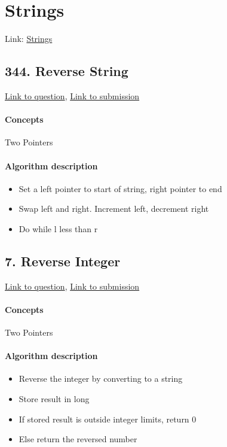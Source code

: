 \documentclass[11pt]{book}
\begin{document}
\newpage

\section{Strings}
Link: \href{https://leetcode.com/explore/interview/card/top-interview-questions-easy/127/strings/}{Strings}

\subsection{344. Reverse String}
\href{https://leetcode.com/problems/reverse-string/}{Link to question},
\href{https://leetcode.com/submissions/detail/333295707/}{Link to submission}
\paragraph{Concepts}
Two Pointers
\paragraph{Algorithm description}
\begin{itemize}
    \item Set a left pointer to start of string, right pointer to end
    \item Swap left and right. Increment left, decrement right
    \item Do while l less than r
\end{itemize}

\subsection{7. Reverse Integer}
\href{https://leetcode.com/problems/reverse-integer/}{Link to question},
\href{https://leetcode.com/submissions/detail/333300400/}{Link to submission}
\paragraph{Concepts}
Two Pointers
\paragraph{Algorithm description}
\begin{itemize}
    \item Reverse the integer by converting to a string
    \item Store result in long
    \item If stored result is outside integer limits, return 0
    \item Else return the reversed number
\end{itemize}
\end{document}
